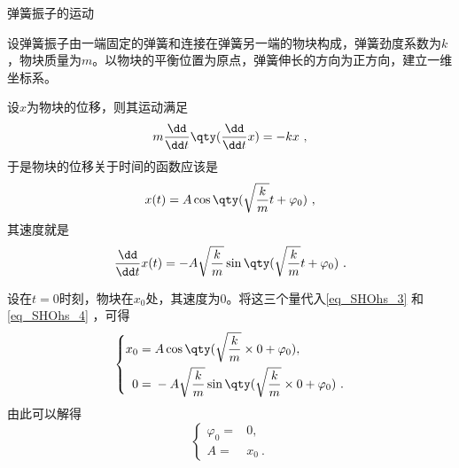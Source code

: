 \begin{example}{弹簧振子的运动}

设弹簧振子由一端固定的弹簧和连接在弹簧另一端的物块构成，弹簧劲度系数为$k$，物块质量为$m$。以物块的平衡位置为原点，弹簧伸长的方向为正方向，建立一维坐标系。

设$x$为物块的位移，则其运动满足
\begin{equation}
m\frac{\dd}{\dd t}\qty(\frac{\dd}{\dd t}x) = -kx~, 
\end{equation}
于是物块的位移关于时间的函数应该是
\begin{equation}\label{eq_SHOhs_3}
x(t) = A\cos\qty(\sqrt{\frac{k}{m}}t+\varphi_0)~, 
\end{equation}
其速度就是
\begin{equation}\label{eq_SHOhs_4}
\frac{\dd}{\dd t}x(t) = -A\sqrt{\frac{k}{m}}\sin\qty(\sqrt{\frac{k}{m}}t+\varphi_0)~. 
\end{equation}

设在$t=0$时刻，物块在$x_0$处，其速度为$0$。将这三个量代入\autoref{eq_SHOhs_3} 和\autoref{eq_SHOhs_4} ，可得
\begin{equation}
\left\{
\begin{aligned}
x_0 ={}& A\cos\qty(\sqrt{\frac{k}{m}}\times0+\varphi_0), \\
0 ={}& -A\sqrt{\frac{k}{m}}\sin\qty(\sqrt{\frac{k}{m}}\times 0+\varphi_0)~. 
\end{aligned}
\right. 
\end{equation}
由此可以解得
\begin{equation}
\left\{
\begin{aligned}
\varphi_0 ={}& 0, \\
A ={}& x_0~. 
\end{aligned}
\right. 
\end{equation}

\end{example}


























